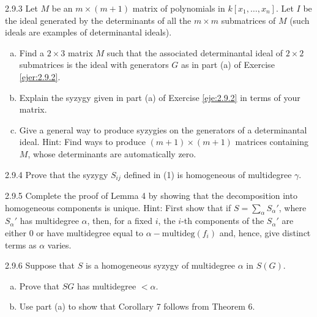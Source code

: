 \documentclass[twoside]{article}
\begin{document}
\begin{ejercicio}{2.9.3}
Let $M$ be an $m × (m + 1)$ matrix of polynomials in $k[x_1, \dots , x_n]$. Let $I$ be the ideal generated
by the determinants of all the $m × m$ submatrices of $M$ (such ideals are examples
of determinantal ideals).
\begin{enumerate}[a.]
\item Find a $2×3$ matrix $M$ such that the associated determinantal ideal of $2×2$ submatrices
is the ideal with generators $G$ as in part (a) of Exercise \ref{ejer:2.9.2}.
\item Explain the syzygy given in part (a) of Exercise \ref{eje:2.9.2} in terms of your matrix.
\item Give a general way to produce syzygies on the generators of a determinantal ideal.
Hint: Find ways to produce $(m + 1) × (m + 1)$ matrices containing $M$, whose determinants
are automatically zero.
\end{enumerate}
\end{ejercicio}
\begin{solucion}

\end{solucion}

\newpage

\begin{ejercicio}{2.9.4}
Prove that the syzygy $S_{ij}$ defined in (1) is homogeneous of multidegree $γ$.
\end{ejercicio}
\begin{solucion}

\end{solucion}
\newpage

\begin{ejercicio}{2.9.5}
Complete the proof of Lemma 4 by showing that the decomposition into homogeneous
components is unique. Hint: First show that if $S =
\sum_{α} S_{α}'$, where $S_{α}'$ has multidegree
$α$, then, for a fixed $i$, the $i$-th components of the $S_{α}'$ are either 0 or have multidegree equal
to $α − \textrm{multideg}( f_i)$ and, hence, give distinct terms as $α$ varies.
\end{ejercicio}
\begin{solucion}

\end{solucion}

\newpage

\begin{ejercicio}{2.9.6}
Suppose that $S$ is a homogeneous syzygy of multidegree $α$ in $S(G)$.
\begin{enumerate}[a.]
\item Prove that $S  G$ has multidegree $< α$.
\item Use part (a) to show that Corollary 7 follows from Theorem 6.
\end{enumerate}
\end{ejercicio}
\begin{solucion}

\end{solucion}
\end{document}
